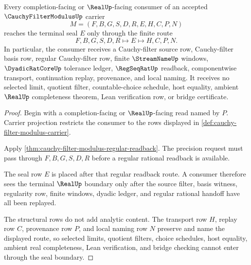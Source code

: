\begin{theorem}
\label{thm:cauchy-filter-modulus-real-handoff}
Every completion-facing or $\RealUp$-facing consumer of an accepted $\CauchyFilterModulusUp$ carrier
$$
M=(F,B,G,S,D,R,E,H,C,P,N)
$$
reaches the terminal seal $E$ only through the finite route
$$
F,B,G,S,D,R \longmapsto E \longmapsto H,C,P,N .
$$
In particular, the consumer receives a Cauchy-filter source row, Cauchy-filter basis row, regular Cauchy-filter row, finite $\StreamNameUp$ windows, $\DyadicRatCoreUp$ tolerance ledger, $\RegSeqRatUp$ readback, componentwise transport, continuation replay, provenance, and local naming. It receives no selected limit, quotient filter, countable-choice schedule, host equality, ambient $\RealUp$ completeness theorem, Lean verification row, or bridge certificate.
\end{theorem}
\begin{proof}
Begin with a completion-facing or $\RealUp$-facing read named by $P$. Carrier projection restricts the consumer to the rows displayed in \autoref{def:cauchy-filter-modulus-carrier}.

Apply \autoref{thm:cauchy-filter-modulus-regular-readback}. The precision request must pass through $F,B,G,S,D,R$ before a regular rational readback is available.

The seal row $E$ is placed after that regular readback route. A consumer therefore sees the terminal $\RealUp$ boundary only after the source filter, basis witness, regularity row, finite windows, dyadic ledger, and regular rational handoff have all been replayed.

The structural rows do not add analytic content. The transport row $H$, replay row $C$, provenance row $P$, and local naming row $N$ preserve and name the displayed route, so selected limits, quotient filters, choice schedules, host equality, ambient real completeness, Lean verification, and bridge checking cannot enter through the seal boundary.
\end{proof}

